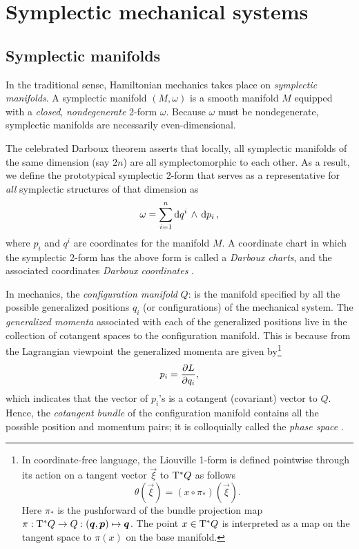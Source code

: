 \section{Symplectic mechanical systems}
\label{sec:symplectic}

\subsection{Symplectic manifolds}
In the traditional sense, Hamiltonian mechanics takes place on \emph{symplectic manifolds}. A symplectic manifold \((M, \omega)\) is a smooth manifold \(M\) equipped with a \emph{closed}, \emph{nondegenerate} 2-form \(\omega\). Because \(\omega\) must be nondegenerate, symplectic manifolds are necessarily even-dimensional. 

The celebrated Darboux theorem asserts that locally, all symplectic manifolds of the same dimension (say \(2n\)) are all symplectomorphic to each other. As a result, we define the prototypical symplectic 2-form that serves as a representative for \emph{all} symplectic structures of that dimension as
\begin{equation}
    \omega = \sum_{i = 1}^n  \dd{q^i}\,\wedge\,\dd{p_i} ,
    \label{eq:darboux_symplectic_form}
\end{equation}
where \(p_i\) and \(q^i\) are coordinates for the manifold \(M\). A coordinate chart in which the symplectic 2-form has the above form is called a \emph{Darboux charts}, and the associated coordinates \emph{Darboux coordinates} \cite{Cannas2001, Arnold1989}.

In mechanics, the \emph{configuration manifold} \(Q\): is the manifold specified by all the possible generalized positions \(q_i\) (or configurations) of the mechanical system. The \emph{generalized momenta} associated with each of the generalized positions live in the collection of cotangent spaces to the configuration manifold. This is because from the Lagrangian viewpoint the generalized momenta are given by\footnote
{
    In coordinate-free language, the Liouville 1-form is defined pointwise through its action on a tangent vector \(\vec{\xi}\) to \(\mathrm{T}^*Q\) as follows
    \begin{equation}
     \theta(\vec{\xi}) = (x \circ \pi_*) (\vec{\xi}).
\end{equation}
    Here \(\pi_*\) is the pushforward of the bundle projection map \(\pi: \ctbundle{Q} \to Q: (\vec{q}, \vec{p}) \mapsto \vec{q}\). The point \(x \in \mathrm{T}^*Q\) is interpreted as a map on the tangent space to \(\pi(x)\) on the base manifold.
}
\begin{equation}
     p_i = \pdv{L}{q_i},
\end{equation}
which indicates that the vector of \(p_i\)'s is a cotangent (covariant) vector to \(Q\). Hence, the \emph{cotangent bundle} of the configuration manifold contains all the possible position and momentum pairs; it is colloquially called the \emph{phase space} \cite{Abraham1978,Arnold1989,Libermann1987}.


